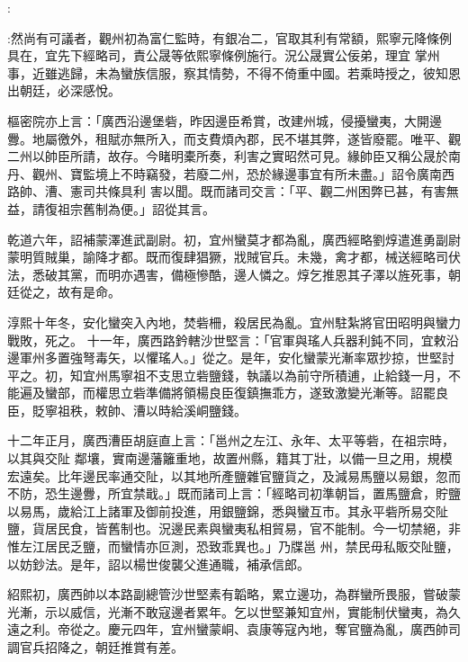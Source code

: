 \begin{pinyinscope}
 :



 :然尚有可議者，觀州初為富仁監時，有銀冶二，官取其利有常額，熙寧元降條例具在，宜先下經略司，責公晟等依熙寧條例施行。況公晟實公佞弟，理宜
 掌州事，近雖逃歸，未為蠻族信服，察其情勢，不得不倚重中國。若乘時授之，彼知恩出朝廷，必深感悅。



 樞密院亦上言：「廣西沿邊堡砦，昨因邊臣希賞，改建州城，侵擾蠻夷，大開邊釁。地屬徼外，租賦亦無所入，而支費煩內郡，民不堪其弊，遂皆廢罷。唯平、觀二州以帥臣所請，故存。今睹明橐所奏，利害之實昭然可見。緣帥臣又稱公晟於南丹、觀州、寶監境上不時竊發，若廢二州，恐於緣邊事宜有所未盡。」詔令廣南西路帥、漕、憲司共條具利
 害以聞。既而諸司交言：「平、觀二州困弊已甚，有害無益，請復祖宗舊制為便。」詔從其言。



 乾道六年，詔補蒙澤進武副尉。初，宜州蠻莫才都為亂，廣西經略劉焞遣進勇副尉蒙明質賊巢，諭降才都。既而復肆猖獗，戕賊官兵。未幾，禽才都，械送經略司伏法，悉破其黨，而明亦遇害，備極慘酷，邊人憐之。焞乞推恩其子澤以旌死事，朝廷從之，故有是命。



 淳熙十年冬，安化蠻突入內地，焚砦柵，殺居民為亂。宜州駐紮將官田昭明與蠻力戰敗，死之。
 十一年，廣西路鈐轄沙世堅言：「官軍與瑤人兵器利鈍不同，宜敕沿邊軍州多置強弩毒矢，以懼瑤人。」從之。是年，安化蠻蒙光漸率眾抄掠，世堅討平之。初，知宜州馬寧祖不支思立砦鹽錢，執議以為前守所積逋，止給錢一月，不能遍及蠻部，而權思立砦準備將領楊良臣復鎮撫乖方，遂致激變光漸等。詔罷良臣，貶寧祖秩，敕帥、漕以時給溪峒鹽錢。



 十二年正月，廣西漕臣胡庭直上言：「邕州之左江、永年、太平等砦，在祖宗時，以其與交阯
 鄰壤，實南邊藩籬重地，故置州縣，籍其丁壯，以備一旦之用，規模宏遠矣。比年邊民率通交阯，以其地所產鹽雜官鹽貨之，及減易馬鹽以易銀，忽而不防，恐生邊釁，所宜禁戢。」既而諸司上言：「經略司初準朝旨，置馬鹽倉，貯鹽以易馬，歲給江上諸軍及御前投進，用銀鹽錦，悉與蠻互市。其永平砦所易交阯鹽，貨居民食，皆舊制也。況邊民素與蠻夷私相貿易，官不能制。今一切禁絕，非惟左江居民乏鹽，而蠻情亦叵測，恐致乖異也。」乃牒邕
 州，禁民毋私販交阯鹽，以妨鈔法。是年，詔以楊世俊襲父進通職，補承信郎。



 紹熙初，廣西帥以本路副總管沙世堅素有韜略，累立邊功，為群蠻所畏服，嘗破蒙光漸，示以威信，光漸不敢寇邊者累年。乞以世堅兼知宜州，實能制伏蠻夷，為久遠之利。帝從之。慶元四年，宜州蠻蒙峒、袁康等寇內地，奪官鹽為亂，廣西帥司調官兵招降之，朝廷推賞有差。




\end{pinyinscope}
